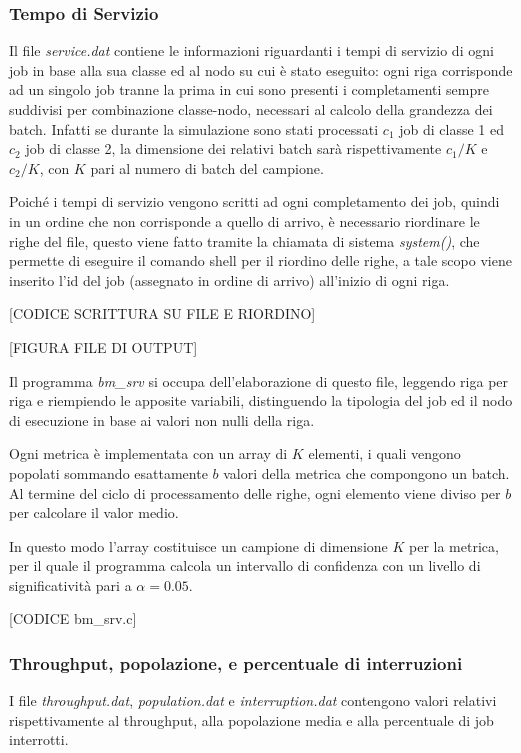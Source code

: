 \subsubsection{Tempo di Servizio} 
Il file \emph{service.dat} contiene le informazioni riguardanti i tempi di
servizio di ogni job in base alla sua classe ed al nodo su cui è stato eseguito:
ogni riga corrisponde ad un singolo job tranne la prima in cui sono presenti i
completamenti sempre suddivisi per combinazione classe-nodo, necessari al
calcolo della grandezza dei batch. Infatti se durante la simulazione sono stati
processati $c_1$ job di classe 1 ed $c_2$ job di classe 2, la dimensione dei
relativi batch sarà rispettivamente $c_1/K$ e $c_2/K$, con $K$ pari al numero di
batch del campione.

Poiché i tempi di servizio vengono scritti ad ogni completamento dei job, quindi
in un ordine che non corrisponde a quello di arrivo, è necessario riordinare le
righe del file, questo viene fatto tramite la chiamata di sistema
\emph{system()}, che permette di eseguire il comando shell per il riordino delle
righe, a tale scopo viene inserito l’id del job (assegnato in ordine di arrivo)
all’inizio di ogni riga.

[CODICE SCRITTURA SU FILE E RIORDINO]

[FIGURA FILE DI OUTPUT]

Il programma \emph{bm\_srv} si occupa dell’elaborazione di questo file, leggendo
riga per riga e riempiendo le apposite variabili, distinguendo la tipologia del
job ed il nodo di esecuzione in base ai valori non nulli della riga.

Ogni metrica è implementata con un array di $K$ elementi, i quali vengono
popolati sommando esattamente $b$ valori della metrica che compongono un batch.
Al termine del ciclo di processamento delle righe, ogni elemento viene diviso
per $b$ per calcolare il valor medio.

In questo modo l’array costituisce un campione di dimensione $K$ per la metrica,
per il quale il programma calcola un intervallo di confidenza con un livello di
significatività pari a $\alpha = 0.05$.

[CODICE bm\_srv.c]
%
\subsubsection{Throughput, popolazione, e percentuale di interruzioni}
I file \emph{throughput.dat}, \emph{population.dat} e \emph{interruption.dat}
contengono valori relativi rispettivamente al throughput, alla popolazione media
e alla percentuale di job interrotti.

